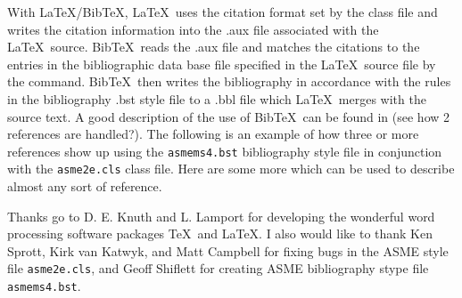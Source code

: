 \documentclass[twocolumn,10pt]{asme2e}
\begin{document}
With \LaTeX/{\sc Bib}\TeX, \LaTeX\ uses the citation format set by the class file and writes the citation information into the .aux file associated with the \LaTeX\ source. {\sc Bib}\TeX\ reads the .aux file and matches the citations to the entries in the bibliographic data base file specified in the \LaTeX\ source file by the \verb++ command. {\sc Bib}\TeX\ then writes the bibliography in accordance with the rules in the bibliography .bst style file to a .bbl file which \LaTeX\ merges with the source text.  A good description of the use of {\sc Bib}\TeX\ can be found in \cite{latex, goosens} (see how 2 references are handled?).  The following is an example of how three or more references \cite{latex, asmemanual,  goosens} show up using the \verb+asmems4.bst+ bibliography style file in conjunction with the \verb+asme2e.cls+ class file. Here are some more \cite{art, blt, ibk, icn, ips, mts, mis, pro, pts, trt, upd} which can be used to describe almost any sort of reference.




\begin{acknowledgment}
Thanks go to D. E. Knuth and L. Lamport for developing the wonderful word processing software packages \TeX\ and \LaTeX. I also would like to thank Ken Sprott, Kirk van Katwyk, and Matt Campbell for fixing bugs in the ASME style file \verb+asme2e.cls+, and Geoff Shiflett for creating 
ASME bibliography stype file \verb+asmems4.bst+.
\end{acknowledgment}

%


\end{document}
